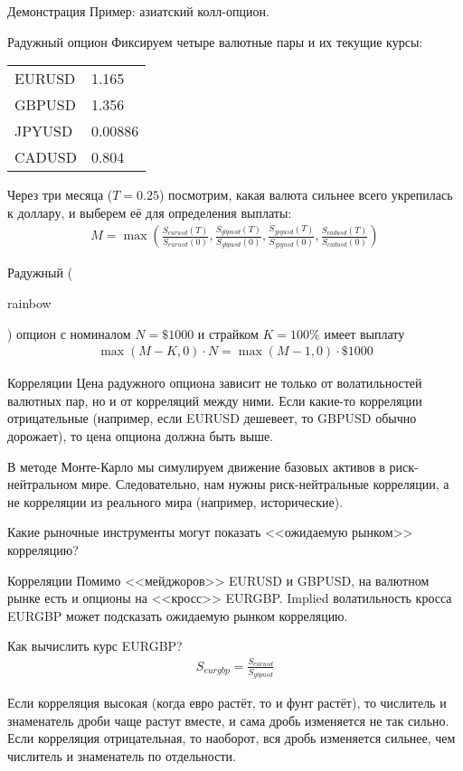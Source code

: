 \documentclass{beamer}
\newcommand{\en}[1]{\begin{otherlanguage}{english}#1\end{otherlanguage}}
\begin{document}
\begin{frame}{Демонстрация}
\justify
Пример: азиатский колл-опцион.
\end{frame}



\begin{frame}{Радужный опцион}
\justify
Фиксируем четыре валютные пары и их текущие курсы:

\centering
\begin{tabular}{l|l}
EURUSD & 1.165 \\
GBPUSD & 1.356 \\
JPYUSD & 0.00886 \\
CADUSD & 0.804
\end{tabular}

\justify
Через три месяца ($T=0.25$) посмотрим, какая валюта сильнее всего укрепилась к доллару, и выберем её для определения выплаты:
\begin{align*}
M = \max\left(\frac{S_{eurusd}(T)}{S_{eurusd}(0)}, \frac{S_{gbpusd}(T)}{S_{gbpusd}(0)}, \frac{S_{jpyusd}(T)}{S_{jpyusd}(0)}, \frac{S_{cadusd}(T)}{S_{cadusd}(0)} \right)
\end{align*}

\justify 
Радужный (\en{rainbow}) опцион с номиналом $N=\$1000$ и страйком $K=100\%$ имеет выплату
\begin{align*}
\max(M - K, 0) \cdot N = \max(M-1, 0) \cdot \$1000
\end{align*}
\end{frame}



\begin{frame}{Корреляции}
\justify
Цена радужного опциона зависит не только от волатильностей валютных пар, но и от корреляций между ними. Если какие-то корреляции отрицательные (например, если EURUSD дешевеет, то GBPUSD обычно дорожает), то цена опциона должна быть выше.

\justify
В методе Монте-Карло мы симулируем движение базовых активов в риск-нейтральном мире. Следовательно, нам нужны риск-нейтральные корреляции, а не корреляции из реального мира (например, исторические).

\justify
Какие рыночные инструменты могут показать <<ожидаемую рынком>> корреляцию?
\end{frame}



\begin{frame}{Корреляции}
\justify
Помимо <<мейджоров>> EURUSD и GBPUSD, на валютном рынке есть и опционы на <<кросс>> EURGBP. Implied волатильность кросса EURGBP может подсказать ожидаемую рынком корреляцию.

\justify
Как вычислить курс EURGBP?
\begin{align*}
S_{eurgbp} = \frac{S_{eurusd}}{S_{gbpusd}}
\end{align*}

\justify
Если корреляция высокая (когда евро растёт, то и фунт растёт), то числитель и знаменатель дроби чаще растут вместе, и сама дробь изменяется не так сильно. Если корреляция отрицательная, то наоборот, вся дробь изменяется сильнее, чем числитель и знаменатель по отдельности.
\end{frame}
\end{document}
